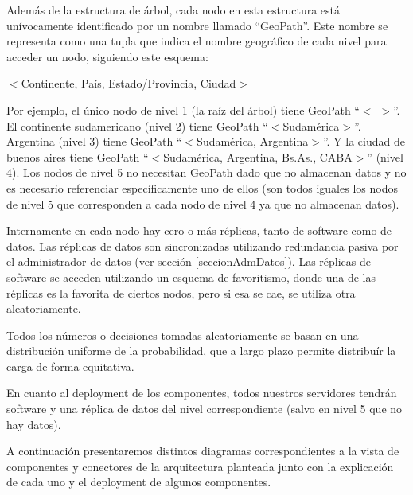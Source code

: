 Además de la estructura de árbol, cada nodo en esta estructura está unívocamente identificado por un nombre llamado ``GeoPath''. Este nombre se representa como una tupla que indica el nombre geográfico de cada nivel para acceder un nodo, siguiendo este esquema:
\begin{center}
	$<$Continente, País, Estado/Provincia, Ciudad$>$
\end{center}

Por ejemplo, el único nodo de nivel 1 (la raíz del árbol) tiene GeoPath ``$<$ $>$''. El continente sudamericano (nivel 2) tiene GeoPath ``$<$Sudamérica$>$''. Argentina (nivel 3) tiene GeoPath ``$<$Sudamérica, Argentina$>$''. Y la ciudad de buenos aires tiene GeoPath ``$<$Sudamérica, Argentina, Bs.As., CABA$>$'' (nivel 4). Los nodos de nivel 5 no necesitan GeoPath dado que no almacenan datos y no es necesario referenciar específicamente uno de ellos (son todos iguales los nodos de nivel 5 que corresponden a cada nodo de nivel 4 ya que no almacenan datos).

Internamente en cada nodo hay cero o más réplicas, tanto de software como de datos. Las réplicas de datos son sincronizadas utilizando redundancia pasiva por el administrador de datos (ver sección \ref{seccionAdmDatos}). Las réplicas de software se acceden utilizando un esquema de favoritismo, donde una de las réplicas es la favorita de ciertos nodos, pero si esa se cae, se utiliza otra aleatoriamente.

Todos los números o decisiones tomadas aleatoriamente se basan en una distribución uniforme de la probabilidad, que a largo plazo permite distribuír la carga de forma equitativa.

En cuanto al deployment de los componentes, todos nuestros servidores tendrán software y una réplica de datos del nivel correspondiente (salvo en nivel 5 que no hay datos).

A continuación presentaremos distintos diagramas correspondientes a la vista de componentes y conectores de la arquitectura planteada junto con la explicación de cada uno y el deployment de algunos componentes.
